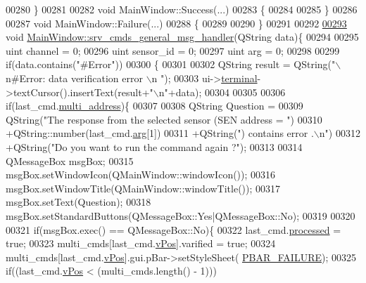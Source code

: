 \begin{DoxyCode}
{{{{{{{{{{{{{{{00280 \}
00281 
00282 \textcolor{keywordtype}{void} MainWindow::Success(...)
00283 \{
00284 
00285 \}
00286 
00287 \textcolor{keywordtype}{void} MainWindow::Failure(...)
00288 \{
00289 
00290 \}
00291 
00292 
\hypertarget{a00049_source_l00293}{}\hyperlink{a00006_a8a8cd34488e8ee213350afb5b2261677}{00293} \textcolor{keywordtype}{void} \hyperlink{a00006_a8a8cd34488e8ee213350afb5b2261677}{MainWindow::srv\_cmds\_general\_msg\_handler}(QString data)\{
00294 
00295 uint  channel   = 0;
00296 uint  sensor\_id = 0;
00297 uint  arg       = 0;
00298 
00299     \textcolor{keywordflow}{if}(data.contains(\textcolor{stringliteral}{"#Error"}))
00300     \{
00301 
00302          QString result =  QString(\textcolor{stringliteral}{"\(\backslash\)n#Error: data verification error \(\backslash\)n "});
00303          ui->\hyperlink{a00027_aae71c46ea4546df5994735dee573b2dd}{terminal}->textCursor().insertText(result+\textcolor{stringliteral}{"\(\backslash\)n"}+data);
00304 
00305 
00306              \textcolor{keywordflow}{if}(last\_cmd.\hyperlink{a00001_a8e69b971c61ced27a7567efd2bf0db59}{multi\_address})\{
00307 
00308                  QString Question =
00309                          QString(\textcolor{stringliteral}{"The response from the selected sensor (SEN address = "})
00310                          +QString::number(last\_cmd.\hyperlink{a00001_a56e6c2d7315d0ae60a51e8b140c9cfe4}{arg}[1])
00311                          +QString(\textcolor{stringliteral}{") contains error .\(\backslash\)n"})
00312                          +QString(\textcolor{stringliteral}{"Do you want to run the command again ?"});
00313 
00314                  QMessageBox msgBox;
00315                  msgBox.setWindowIcon(QMainWindow::windowIcon());
00316                  msgBox.setWindowTitle(QMainWindow::windowTitle());
00317                  msgBox.setText(Question);
00318                  msgBox.setStandardButtons(QMessageBox::Yes|QMessageBox::No);
00319 
00320 
00321                  \textcolor{keywordflow}{if}(msgBox.exec() == QMessageBox::No)\{
00322                  last\_cmd.\hyperlink{a00001_a3e88f779da9798a5da7dda227e2ca388}{processed} = \textcolor{keyword}{true};
00323                  multi\_cmds[last\_cmd.\hyperlink{a00001_a2b48b371fd84be2a8ad581b1ad708b88}{vPos}].varified = \textcolor{keyword}{true};
00324                  multi\_cmds[last\_cmd.\hyperlink{a00001_a2b48b371fd84be2a8ad581b1ad708b88}{vPos}].gui.pBar->setStyleSheet(
      \hyperlink{a00034_aa9f43b2774395af6510910f8feed7cb4}{PBAR\_FAILURE});
00325                  \textcolor{keywordflow}{if}((last\_cmd.\hyperlink{a00001_a2b48b371fd84be2a8ad581b1ad708b88}{vPos} < (multi\_cmds.length() - 1)))
}}}}}}}}}}}}}}}
\end{DoxyCode}
